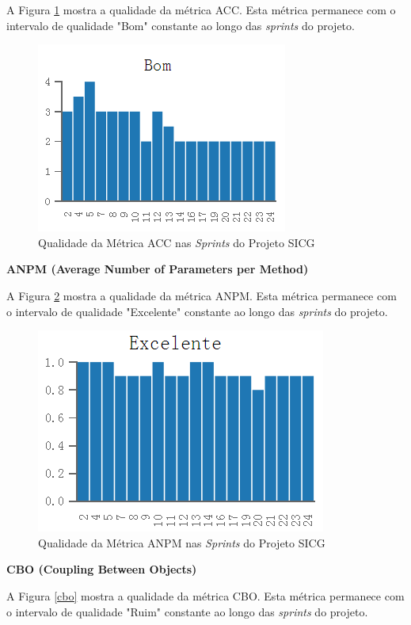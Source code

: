 A Figura \ref{acc} mostra a qualidade da métrica ACC. Esta métrica permanece com o intervalo de qualidade "Bom" constante ao longo das \textit{sprints} do projeto.

\begin{figure}[H]
		\centering
			\includegraphics[scale=1.0]{figuras/acc.png}
		\caption{Qualidade da Métrica ACC nas \textit{Sprints} do Projeto SICG}
		\label{acc}
\end{figure}

\textbf{ANPM (Average Number of Parameters per Method)}

A Figura \ref{anpm} mostra a qualidade da métrica ANPM. Esta métrica permanece com o intervalo de qualidade "Excelente" constante ao longo das \textit{sprints} do projeto.

\begin{figure}[H]
		\centering
			\includegraphics[scale=1.0]{figuras/anpm.png}
		\caption{Qualidade da Métrica ANPM nas \textit{Sprints} do Projeto SICG}
		\label{anpm}
\end{figure}

\textbf{CBO (Coupling Between Objects)}

A Figura \ref{cbo} mostra a qualidade da métrica CBO. Esta métrica permanece com o intervalo de qualidade "Ruim" constante ao longo das \textit{sprints} do projeto.


